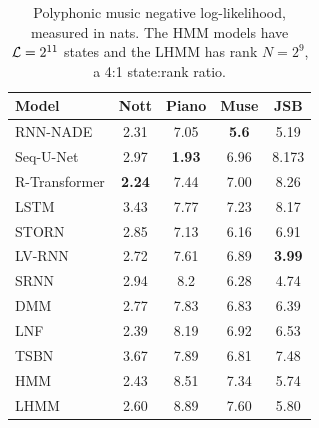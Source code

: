 \documentclass{article}
\begin{document}
\begin{table}[t]
\centering
\begin{tabular}{lcccc}
\toprule
Model       & Nott & Piano & Muse & JSB \\
\midrule
RNN-NADE & 2.31  & 7.05        & \textbf{5.6}        & 5.19          \\
Seq-U-Net & 2.97 & \textbf{1.93} & 6.96 & 8.173 \\
R-Transformer & \textbf{2.24} & 7.44 & 7.00 & 8.26 \\
LSTM  & 3.43 & 7.77   & 7.23 & 8.17     \\
STORN    & 2.85       & 7.13        &  6.16       & 6.91  \\
LV-RNN    & 2.72       & 7.61        & 6.89       &\textbf{ 3.99}\\
SRNN     & 2.94       & 8.2         & 6.28       & 4.74          \\
DMM     & 2.77 &    7.83 &  6.83 &  6.39 \\
LNF  & 2.39  & 8.19 & 6.92  & 6.53    \\
\midrule
TSBN     & 3.67       & 7.89        & 6.81       & 7.48          \\
HMM &  2.43 & 8.51 & 7.34 & 5.74 \\
LHMM & 2.60 & 8.89 & 7.60 & 5.80 \\
\bottomrule
\end{tabular}
\caption{\label{tbl:full-music}
Polyphonic music negative log-likelihood, measured in nats.
The HMM models have $\mathcal{L}=2^{11}$ states and the LHMM has rank $N=2^{9}$, a 4:1 state:rank ratio.
}
\end{table}
\end{document}
